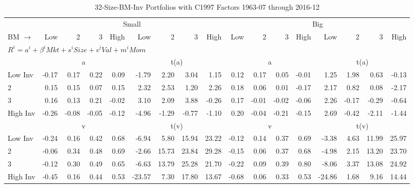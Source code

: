 
\begin{table}[!ht]
\centering
\caption{32-Size-BM-Inv Portfolios with C1997 Factors 1963-07 through 2016-12}
\begin{tabular}{lrrrrrrrrrrrrrrrr}
  \toprule
    & \multicolumn{8}{c}{Small} & \multicolumn{8}{c}{Big} \\
      \cmidrule(r){2-9} \cmidrule(r){10-17}
    BM $\rightarrow$ & Low & 2 & 3 & High & Low & 2 & 3 & High & Low & 2 & 3 & High & Low & 2 & 3 & High \\ 
  \midrule
  \multicolumn{17}{l}{$R^i=a^i+\beta^iMkt+s^iSize+v^iVal+m^iMom$} \\

  
    
      & \multicolumn{4}{c}{a} & \multicolumn{4}{c}{t(a)}
    
      & \multicolumn{4}{c}{a} & \multicolumn{4}{c}{t(a)}
    
    \\
      \cmidrule(r){2-5} \cmidrule(r){6-9} \cmidrule(r){10-13} \cmidrule(r){14-17}

    Low Inv   & -0.17  & 0.17  & 0.22  & 0.09  & -1.79  & 2.20  & 3.04  & 1.15  & 0.12  & 0.17  & 0.05  & -0.01  & 1.25  & 1.98  & 0.63  & -0.13  \\
           2  & 0.15  & 0.15  & 0.07  & 0.15  & 2.32  & 2.53  & 1.20  & 2.26  & 0.18  & 0.06  & 0.01  & -0.17  & 2.17  & 0.82  & 0.08  & -2.17  \\
           3  & 0.16  & 0.13  & 0.21  & -0.02  & 3.10  & 2.09  & 3.88  & -0.26  & 0.17  & -0.01  & -0.02  & -0.06  & 2.26  & -0.17  & -0.29  & -0.64  \\
    High Inv  & -0.26  & -0.08  & -0.05  & -0.12  & -4.96  & -1.29  & -0.77  & -1.10  & 0.20  & -0.04  & -0.21  & -0.15  & 2.69  & -0.42  & -2.11  & -1.44  \\

  
    
      & \multicolumn{4}{c}{v} & \multicolumn{4}{c}{t(v)}
    
      & \multicolumn{4}{c}{v} & \multicolumn{4}{c}{t(v)}
    
    \\
      \cmidrule(r){2-5} \cmidrule(r){6-9} \cmidrule(r){10-13} \cmidrule(r){14-17}

    Low Inv   & -0.24  & 0.16  & 0.42  & 0.68  & -6.94  & 5.80  & 15.94  & 23.22  & -0.12  & 0.14  & 0.37  & 0.69  & -3.38  & 4.63  & 11.99  & 25.97  \\
           2  & -0.06  & 0.34  & 0.48  & 0.69  & -2.66  & 15.73  & 23.84  & 29.28  & -0.15  & 0.06  & 0.37  & 0.68  & -4.98  & 2.15  & 13.20  & 23.70  \\
           3  & -0.12  & 0.30  & 0.49  & 0.65  & -6.63  & 13.79  & 25.28  & 21.70  & -0.22  & 0.09  & 0.39  & 0.80  & -8.06  & 3.37  & 13.08  & 24.92  \\
    High Inv  & -0.45  & 0.16  & 0.44  & 0.53  & -23.57  & 7.30  & 17.80  & 13.67  & -0.68  & 0.06  & 0.33  & 0.53  & -24.86  & 1.68  & 9.16  & 14.44  \\


\end{tabular}
\end{table}

